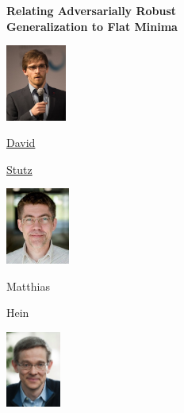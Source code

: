 \documentclass[64pt,aspectratio=169]{beamer}
\begin{document}
	\begingroup
	\begin{frame}
		\begin{center}  
			\vspace*{-0.5cm}
			\begin{minipage}[t]{4.5cm}
				\centering
			\end{minipage}
			\vspace*{-0.25cm}
						
			{\huge\bfseries Relating Adversarially Robust\\[4px] Generalization to Flat Minima}
			\vskip 0.5cm
			
			\begin{center}
				\begin{minipage}{0.225\textwidth}
					\centering
					\includegraphics[height=2.5cm]{gfx/profilepicture}
						
					\footnotesize
					
					\underline{David}
					
					\underline{Stutz}
				\end{minipage}
				\begin{minipage}{0.225\textwidth}
					\centering
					\includegraphics[height=2.5cm,trim={0.1cm 0 0.15cm 0}, clip]{gfx/matthiashein}
					
					\footnotesize
					
					Matthias
					
					Hein
				\end{minipage}
				\begin{minipage}{0.225\textwidth}
					\centering
					\includegraphics[height=2.5cm]{gfx/berntschiele}
					

\end{minipage}
\end{center}
\end{center}
\end{frame}
\end{document}
